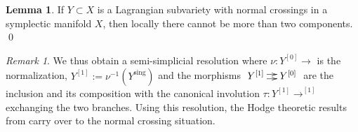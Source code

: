 \documentclass[a4paper,11pt,final]{amsart}
\theoremstyle{plain}
\theoremstyle{definition}
\newtheorem{lemma}[subsection]{Lemma}
\numberwithin{equation}{section}
\theoremstyle{remark}
\newtheorem{remark}[subsection]{Remark}
\begin{document}
\begin{lemma}\label{lemma lagrangian snc}
If $Y\subset X$ is a Lagrangian subvariety with normal crossings in a symplectic manifold $X$, then locally there cannot be more than two components. \qed
\end{lemma}
\begin{remark}\label{remark only nc}
 We thus obtain a semi-simplicial resolution where $\nu:Y^{[0]}{\xrightarrow{\ \ }}$ is the normalization, $Y^{[1]} :=\nu^{-1}(Y^{{\operatorname{sing}}})$ and the morphisms $\xymatrix@C=1em{Y^{[1]} \ar@<0.5ex>[r]\ar@<-0.5ex>[r] & Y^{[0]}}$ are the inclusion and its composition with the canonical involution $\tau :Y^{[1]}{\xrightarrow{\ \ }}^{[1]}$ exchanging the two branches. Using this resolution, the Hodge theoretic results from \cite{CL12} carry over to the normal crossing situation.
\end{remark}
\end{document}
